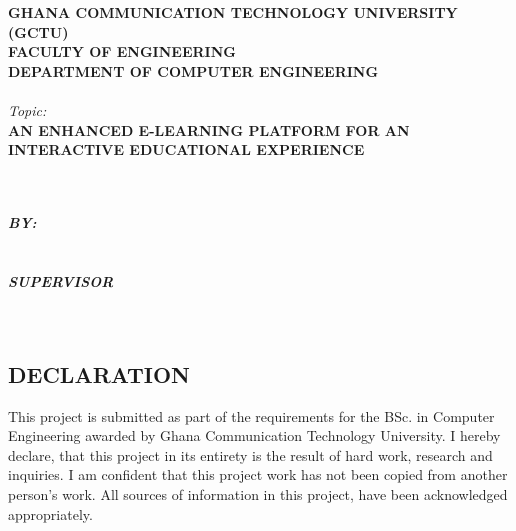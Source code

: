 \documentclass[a4paper,12pt]{article}  %
\begin{document}
\begin{titlepage}
  \centering
  \large{\textbf{GHANA COMMUNICATION TECHNOLOGY UNIVERSITY (GCTU) }}\\
  \vspace{0.5cm}
  \large{\textbf{FACULTY OF ENGINEERING}}\\
  \vspace{0.5cm}
  \large{\textbf{DEPARTMENT OF COMPUTER ENGINEERING}}\\
  \vspace{1cm}
  \\
  \vspace{1cm}
  \textit{Topic:}\\
  \vspace{1cm}
  \textbf{AN ENHANCED E-LEARNING PLATFORM FOR AN INTERACTIVE EDUCATIONAL EXPERIENCE}\\
  \vspace{1cm}
  \\
  \\
  \vspace{1cm}

  \textbf{\textit{BY:}}\\
  \vspace{0.5cm}
  \\
  \vspace{0.5cm}
  \\
  \vspace{1cm}
  \textbf{\textit{SUPERVISOR}}\\
  \vspace{0.5cm}
  \\
  \\
\end{titlepage}
\newpage
\begin{center}
    \section*{DECLARATION}
    This project is submitted as part of the requirements for the BSc. in Computer Engineering awarded by Ghana Communication Technology University. I hereby declare, that this project in its entirety is the result of hard work, research and inquiries. I am confident that this project work has not been copied from another person’s work. All sources of information in this project, have been acknowledged appropriately.
\end{center}
\end{document}

